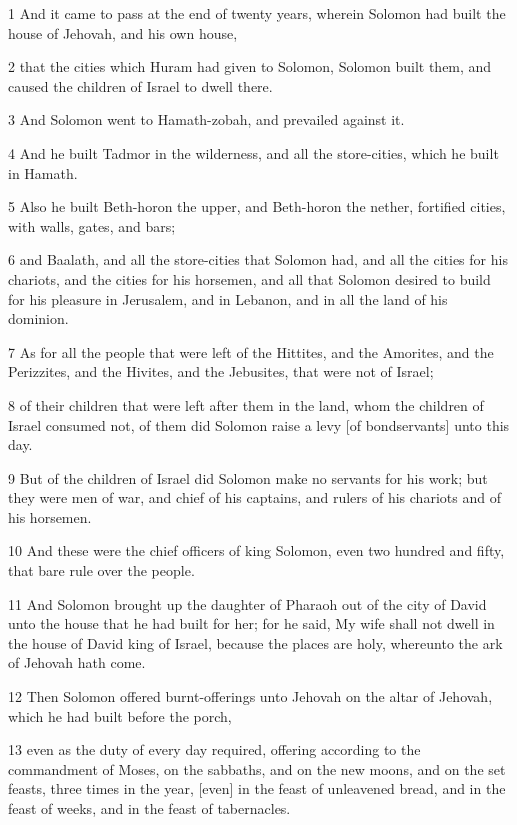 \par 1 And it came to pass at the end of twenty years, wherein Solomon had built the house of Jehovah, and his own house,
\par 2 that the cities which Huram had given to Solomon, Solomon built them, and caused the children of Israel to dwell there.
\par 3 And Solomon went to Hamath-zobah, and prevailed against it.
\par 4 And he built Tadmor in the wilderness, and all the store-cities, which he built in Hamath.
\par 5 Also he built Beth-horon the upper, and Beth-horon the nether, fortified cities, with walls, gates, and bars;
\par 6 and Baalath, and all the store-cities that Solomon had, and all the cities for his chariots, and the cities for his horsemen, and all that Solomon desired to build for his pleasure in Jerusalem, and in Lebanon, and in all the land of his dominion.
\par 7 As for all the people that were left of the Hittites, and the Amorites, and the Perizzites, and the Hivites, and the Jebusites, that were not of Israel;
\par 8 of their children that were left after them in the land, whom the children of Israel consumed not, of them did Solomon raise a levy [of bondservants] unto this day.
\par 9 But of the children of Israel did Solomon make no servants for his work; but they were men of war, and chief of his captains, and rulers of his chariots and of his horsemen.
\par 10 And these were the chief officers of king Solomon, even two hundred and fifty, that bare rule over the people.
\par 11 And Solomon brought up the daughter of Pharaoh out of the city of David unto the house that he had built for her; for he said, My wife shall not dwell in the house of David king of Israel, because the places are holy, whereunto the ark of Jehovah hath come.
\par 12 Then Solomon offered burnt-offerings unto Jehovah on the altar of Jehovah, which he had built before the porch,
\par 13 even as the duty of every day required, offering according to the commandment of Moses, on the sabbaths, and on the new moons, and on the set feasts, three times in the year, [even] in the feast of unleavened bread, and in the feast of weeks, and in the feast of tabernacles.
